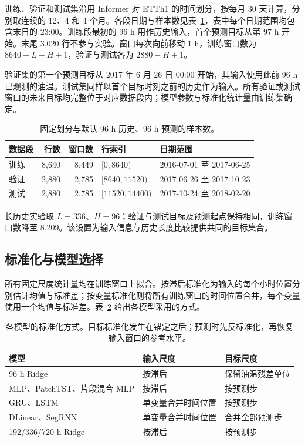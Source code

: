 \documentclass[UTF8,a4paper,11pt,fontset=windows]{ctexart}
\begin{document}
训练、验证和测试集沿用 Informer 对 ETTh1 的时间划分，按每月 30 天计算，分别取连续的 12、4 和 4 个月\cite{informer2021,tslib2024}。各段日期与样本数见表~\ref{tab:split}，表中每个日期范围均包含末日的 23:00。训练段最初的 96 h 用作历史输入，首个预测目标从第 97 h 开始。末尾 3,020 行不参与实验。窗口每次向前移动 1 h，训练窗口数为 $8640-L-H+1$，验证与测试各为 $2880-H+1$。

验证集的第一个预测目标从 2017 年 6 月 26 日 00:00 开始，其输入使用此前 96 h 已观测的油温。测试集同样以首个目标时刻之前的历史作为输入。所有验证或测试窗口的未来目标均完整位于对应数据段内；模型参数与标准化统计量由训练集确定。

\begin{table}[htbp]
\centering\small
\caption{固定划分与默认 96 h 历史、96 h 预测的样本数。}
\label{tab:split}
\begin{tabular}{lrrll}
\toprule 数据段 & 行数 & 窗口数 & 行索引 & 日期范围\\\midrule
训练 & 8,640 & 8,449 & $[0,8640)$ & 2016-07-01 至 2017-06-25\\
验证 & 2,880 & 2,785 & $[8640,11520)$ & 2017-06-26 至 2017-10-23\\
测试 & 2,880 & 2,785 & $[11520,14400)$ & 2017-10-24 至 2018-02-20\\\bottomrule
\end{tabular}
\end{table}

长历史实验取 $L=336$、$H=96$；验证与测试目标及预测起点保持相同，训练窗口数降至 8,209。该设置为输入信息与历史长度比较提供共同的目标集合。

\subsection{标准化与模型选择}
所有固定尺度统计量均在训练窗口上拟合。按滞后标准化为输入的每个小时位置分别估计均值与标准差；按变量标准化则将所有训练窗口的时间位置合并，每个变量使用一个均值与标准差。表~\ref{tab:scale} 给出各模型采用的方式。

\begin{table}[htbp]
\centering\small
\caption{各模型的标准化方式。目标标准化发生在锚定之后；预测时先反标准化，再恢复输入窗口的参考水平。}
\label{tab:scale}
\begin{tabularx}{\linewidth}{lXX}
\toprule 模型 & 输入尺度 & 目标尺度\\\midrule
96 h Ridge & 按滞后 & 保留油温残差单位\\
MLP、PatchTST、片段混合 MLP & 按滞后 & 按预测步\\
GRU、LSTM & 单变量合并时间位置 & 按预测步\\
DLinear、SegRNN & 单变量合并时间位置 & 合并全部预测步\\
192/336/720 h Ridge & 按滞后 & 按预测步\\
\bottomrule
\end{tabularx}
\end{table}
\end{document}

